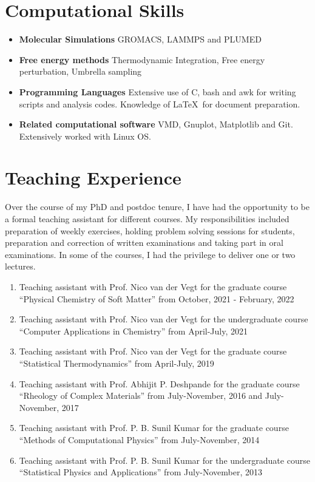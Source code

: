 \documentclass[a4paper,14pt]{article}
\begin{document}
\section*{Computational Skills}
\begin{itemize}
\item
\textbf{Molecular Simulations}\newline
GROMACS, LAMMPS and PLUMED
\end{itemize}
\begin{itemize}
\item
\textbf{Free energy methods}\newline
Thermodynamic Integration, Free energy perturbation, Umbrella sampling
\end{itemize}
\begin{itemize}
\item
\textbf{Programming Languages }\newline
Extensive use of C, bash and awk for writing scripts and analysis codes. Knowledge
of \LaTeX~for document preparation.
\end{itemize}
\begin{itemize}
\item
\textbf{Related computational software}\newline
VMD, Gnuplot, Matplotlib and Git. Extensively worked with Linux OS.
\end{itemize}


\section*{Teaching Experience}
Over the course of my PhD and postdoc tenure, I have had the opportunity to be
a formal teaching assistant for different courses. My responsibilities included
preparation of weekly exercises, holding problem solving sessions for
students, preparation and correction of written examinations and taking part in
oral examinations. In some of the courses, I had the privilege to deliver one
or two lectures. 
\begin{enumerate}
\item
Teaching assistant with Prof. Nico van der Vegt for the graduate course
\enquote{Physical Chemistry of Soft Matter} from October, 2021 - February, 2022
\item
Teaching assistant with Prof. Nico van der Vegt for the undergraduate course
\enquote{Computer Applications in Chemistry} from April-July, 2021  
\item
Teaching assistant with Prof. Nico van der Vegt for the graduate course
\enquote{Statistical Thermodynamics} from April-July, 2019 
\item
Teaching assistant with Prof. Abhijit P. Deshpande for the graduate course
\enquote{Rheology of Complex Materials} from July-November, 2016 and
July-November, 2017
\item
Teaching assistant with Prof. P. B. Sunil Kumar for the graduate course
\enquote{Methods of Computational Physics} from July-November, 2014
\item
Teaching assistant with Prof. P. B. Sunil Kumar for the undergraduate course \enquote{Statistical Physics and Applications} from July-November, 2013
\end{enumerate}
\end{document}
